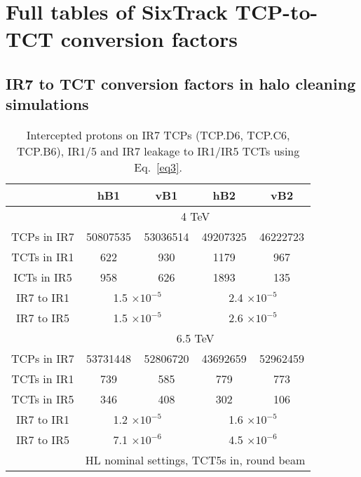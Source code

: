 \section{Full tables of SixTrack TCP-to-TCT conversion factors}
\subsection{IR7 to TCT conversion factors in halo cleaning simulations}
\begin{table}
   \centering
   \caption{Intercepted protons on IR7 TCPs (\textsc{TCP.D6, TCP.C6, TCP.B6}), IR1/5 and IR7 leakage to IR1/IR5 TCTs using Eq.~\ref{eq3}.}

   \begin{tabular}{c|cc|cc}

       & hB1 & vB1 & hB2 & vB2\\ \hline       
       & \multicolumn{4}{c}{4 TeV} \\   %
       TCPs in IR7 & 50807535 & 53036514 & 49207325 & 46222723 \\
       TCTs in IR1 & 622 & 930 & 1179 & 967 \\
       ICTs in IR5 & 958 & 626 & 1893 & 135 \\ %
       IR7 to IR1  & \multicolumn{2}{c|}{1.5 $\times 10^{-5}$} & \multicolumn{2}{c}{2.4 $\times 10^{-5}$ } \\
       IR7 to IR5  & \multicolumn{2}{c|}{1.5 $\times 10^{-5}$} & \multicolumn{2}{c}{2.6 $\times 10^{-5}$ } \\
       \hline
       & \multicolumn{4}{c}{6.5 TeV} \\      
       TCPs in IR7 & 53731448 & 52806720 & 43692659 & 52962459 \\
       TCTs in IR1 & 739 & 585 & 779 & 773 \\
       TCTs in IR5 & 346 & 408 & 302 & 106 \\%
       IR7 to IR1 &  \multicolumn{2}{c|}{1.2 $\times 10^{-5}$} &  \multicolumn{2}{c}{1.6 $\times 10^{-5}$ } \\
       IR7 to IR5 &  \multicolumn{2}{c|}{7.1 $\times 10^{-6}$} &  \multicolumn{2}{c}{4.5 $\times 10^{-6}$ } \\
       \hline       
       & \multicolumn{4}{c}{HL nominal settings, TCT5s in, round beam}  \\ %
       

\end{tabular}
\end{table}
